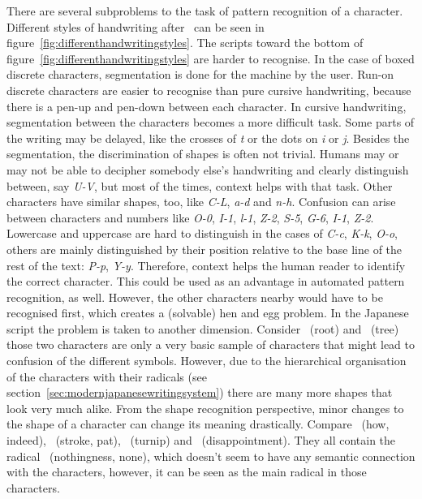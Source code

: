 
There are several subproblems to the task of pattern recognition of a character.
Different styles of handwriting after~ can be seen in 
figure~\ref{fig:differenthandwritingstyles}.
The scripts toward the bottom of figure~\ref{fig:differenthandwritingstyles} 
are harder to recognise. In the case of boxed discrete characters, segmentation 
is done for the machine by the user. Run-on discrete characters are easier to 
recognise than pure cursive handwriting, because there is a pen-up and 
pen-down between each character. In cursive handwriting, segmentation 
between the characters becomes a more difficult task. Some parts of the writing
may be delayed, like the crosses of \emph{t} or the dots on \emph{i} or \emph{j}.
Besides the segmentation, the discrimination of shapes is often not trivial.
Humans may or may not be able to decipher somebody else's handwriting and clearly
distinguish between, say \emph{U-V}, but most of the times, context helps with 
that task. Other characters have similar shapes, too, like \emph{C-L}, \emph{a-d}
and \emph{n-h}. Confusion can arise between characters and numbers like 
\emph{O-0}, \emph{I-1}, \emph{l-1}, \emph{Z-2}, \emph{S-5}, \emph{G-6}, 
\emph{I-1}, \emph{Z-2}. Lowercase and uppercase are hard to distinguish in the
cases of \emph{C-c}, \emph{K-k}, \emph{O-o}, others are mainly distinguished 
by their position relative to the base line of the rest of the text: 
\emph{P-p}, \emph{Y-y}. Therefore, context helps the human reader to identify
the correct character. This could be used as an advantage in automated pattern
recognition, as well. However, the other characters nearby would have to be
recognised first, which creates a (solvable) hen and egg problem.
In the Japanese script the problem is taken to another dimension. 
Consider ~(root) and ~(tree) those two characters are only a 
very basic sample of characters that might lead to confusion of the different 
symbols. However, due to the hierarchical organisation of the characters 
with their radicals (see section~\ref{sec:modernjapanesewritingsystem}) there 
are many more shapes that look very much alike. From the shape recognition 
perspective, minor changes to the shape of a character can change its meaning 
drastically.
Compare ~(how, indeed), ~(stroke, pat), ~(turnip) and
~(disappointment). They all contain the radical 
~(nothingness, none), which doesn't seem to have any semantic connection
with the characters, however, it can be seen as the main radical in those 
characters.

